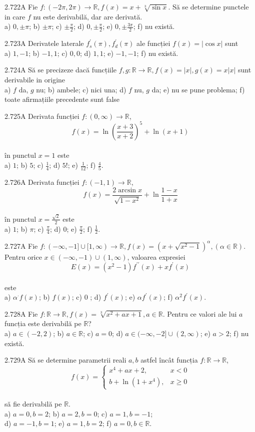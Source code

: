 \documentclass[11pt]{article}
\begin{document}
2.722A Fie $f:(-2 \pi, 2 \pi) \rightarrow \mathbb{R}, f(x)=x+\sqrt[3]{\sin x}$. Să se determine punctele in care $f$ nu este derivabilă, dar are derivată.\\ a) $0, \pm \pi$; b) $\pm \pi$; c) $\pm \frac{\pi}{2}$; d) $0, \pm \frac{\pi}{2}$; e) $0, \pm \frac{3 \pi}{2}$; f) nu există.

2.723A Derivatele laterale $f_{s}^{\prime}(\pi), f_{d}^{\prime}(\pi)$ ale funcției $f(x)=|\cos x|$ sunt\\ a) $1,-1$; b) $-1,1$; c) $0,0$; d) $1,1$; e) $-1,-1$; f) nu există.

2.724A Să se precizeze dacă funcțiile $f, g: \mathbb{R} \rightarrow \mathbb{R}, f(x)=|x|, g(x)=x|x|$ sunt derivabile in origine\\ a) $f$ da, $g$ nu; b) ambele; c) nici una; d) $f$ nu, $g$ da; e) nu se pune problema; f) toate afirmațiile precedente sunt false

2.725A Derivata funcției $f:(0, \infty) \rightarrow \mathbb{R}$, $$f(x)=\ln \left(\frac{x+3}{x+2}\right)^{5}+\ln (x+1)$$\\în punctul $x=1$ este\\ a) $1$; b) $5$; c) $\frac{1}{4}$; d) $5!$; e) $\frac{1}{12}$; f) $\frac{4}{5}$.

2.726A Derivata funcției $f:(-1,1) \rightarrow \mathbb{R}$, $$f(x)=\frac{2 \arcsin x}{\sqrt{1-x^{2}}}+\ln \frac{1-x}{1+x}$$\\în punctul $x=\frac{\sqrt{2}}{2}$ este\\ a) $1$; b) $\pi$; c) $\frac{\pi}{4}$; d) $0$; e) $\frac{\pi}{2}$; f) $\frac{1}{2}$.

2.727A Fie $f:(-\infty,-1] \cup[1, \infty) \rightarrow \mathbb{R}, f(x)=\left(x+\sqrt{x^{2}-1}\right)^{\alpha},(\alpha \in \mathbb{R})$. Pentru orice $x \in(-\infty,-1) \cup(1, \infty)$, valoarea expresiei $$E(x)=\left(x^{2}-1\right) f^{\prime \prime}(x)+x f^{\prime}(x)$$\\este\\a) $\alpha^{\cdot} f(x)$; b) $f(x)$; c) 0 ; d) $f^{\prime}(x)$; e) $\alpha f^{\prime}(x)$; f) $\alpha^{2} f^{\prime}(x)$.

2.728A Fie $f: \mathbb{R} \rightarrow \mathbb{R}, f(x)=\sqrt[3]{x^{2}+a x+1}, a \in \mathbb{R}$. Pentru ce valori ale lui $a$ funcția este derivabilă pe $\mathbb{R}$?\\ a) $a \in(-2,2)$; b) $a \in \mathbb{R}$; c) $a=0$; d) $a \in(-\infty,-2] \cup(2, \infty)$; e) $a>2$; f) nu există.

2.729A Să se determine parametrii reali $a, b$ astfel încât funcția $f: \mathbb{R} \rightarrow \mathbb{R}$, $$f(x)= \begin{cases}x^{4}+a x+2, & x<0 \\ b+\ln \left(1+x^{4}\right), & x \geq 0\end{cases}$$\\ să fie derivabilă pe $\mathbb{R}$.\\ a) $a=0, b=2$; b) $a=2, b=0$; c) $a=1, b=-1$;\\ d) $a=-1, b=1$; e) $a=1, b=2$; f) $a=0, b \in \mathbb{R}$.
\end{document}
